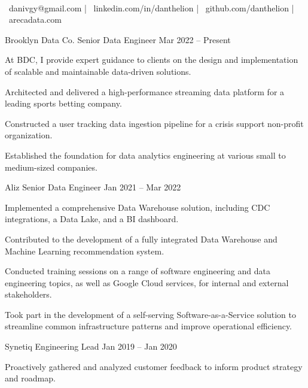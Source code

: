 \documentclass[]{awesome-cv}
\begin{document}
    
\begin{center}
	  \\
	\vspace{2mm}
	{\faEnvelope\ danivgy@gmail.com} | {\faLink\ linkedin.com/in/danthelion} | {\faLink\ github.com/danthelion} | {\faLink\ arecadata.com}
\end{center}
\begin{cventries}
	\cventry
	{Brooklyn Data Co.}
	{Senior Data Engineer}
	{Mar 2022 – Present}
	{}
	{\begin{cvitems}
		\item {At BDC, I provide expert guidance to clients on the design and implementation of scalable and maintainable data-driven solutions.}
		\item {Architected and delivered a high-performance streaming data platform for a leading sports betting company.}
		\item {Constructed a user tracking data ingestion pipeline for a crisis support non-profit organization.}
		\item {Established the foundation for data analytics engineering at various small to medium-sized companies.}
		\end{cvitems}}
	\cventry
	{Aliz}
	{Senior Data Engineer}
	{Jan 2021 – Mar 2022}
	{}
	{\begin{cvitems}
		\item {Implemented a comprehensive Data Warehouse solution, including CDC integrations, a Data Lake, and a BI dashboard.}
		\item {Contributed to the development of a fully integrated Data Warehouse and Machine Learning recommendation system.}
		\item {Conducted training sessions on a range of software engineering and data engineering topics, as well as Google Cloud services, for internal and external stakeholders.}
		\item {Took part in the development of a self-serving Software-as-a-Service solution to streamline common infrastructure patterns and improve operational efficiency.}
		\end{cvitems}}
	\cventry
	{Synetiq}
	{Engineering Lead}
	{Jan 2019 – Jan 2020}
	{}
	{\begin{cvitems}
		\item {Proactively gathered and analyzed customer feedback to inform product strategy and roadmap.}

\end{cvitems}}
\end{cventries}
\end{document}
